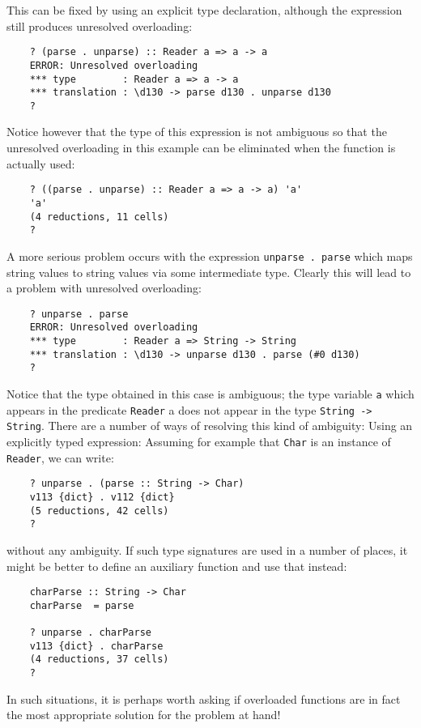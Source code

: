 This can be fixed by using an explicit type declaration,  although  the
expression still produces unresolved overloading:
\begin{verbatim}
    ? (parse . unparse) :: Reader a => a -> a
    ERROR: Unresolved overloading
    *** type        : Reader a => a -> a
    *** translation : \d130 -> parse d130 . unparse d130
    ?
\end{verbatim}
Notice however that the type of this expression  is  not  ambiguous  so
that the unresolved overloading in this example can be eliminated  when
the function is actually used:
\begin{verbatim}
    ? ((parse . unparse) :: Reader a => a -> a) 'a'
    'a'
    (4 reductions, 11 cells)
    ?
\end{verbatim}
A more serious problem occurs with the  expression  \verb"unparse . parse"
which maps string values to string values via some  intermediate  type.
Clearly this will lead to a problem with unresolved overloading:
\begin{verbatim}
    ? unparse . parse
    ERROR: Unresolved overloading
    *** type        : Reader a => String -> String
    *** translation : \d130 -> unparse d130 . parse (#0 d130)
    ?
\end{verbatim}
Notice that the type obtained in  this  case  is  ambiguous;  the  type
variable \verb"a" which appears in the predicate 
\verb"Reader" a does not  appear  in
the type \verb"String -> String".  There are a number  of  ways  of  resolving
this kind of ambiguity:
\BI
\IT  Using an explicitly typed expression: Assuming  for  example  that
     \verb"Char" is an instance of \verb"Reader", we can write:
\begin{verbatim}
    ? unparse . (parse :: String -> Char)
    v113 {dict} . v112 {dict}
    (5 reductions, 42 cells)
    ?
\end{verbatim}
     without any ambiguity.  If such type  signatures  are  used  in  a
     number of places, it  might  be  better  to  define  an  auxiliary
     function and use that instead:
\begin{verbatim}
    charParse :: String -> Char
    charParse  = parse

    ? unparse . charParse
    v113 {dict} . charParse
    (4 reductions, 37 cells)
    ?
\end{verbatim}
     In such situations, it  is  perhaps  worth  asking  if  overloaded
     functions are in  fact  the  most  appropriate  solution  for  the
     problem at hand!

